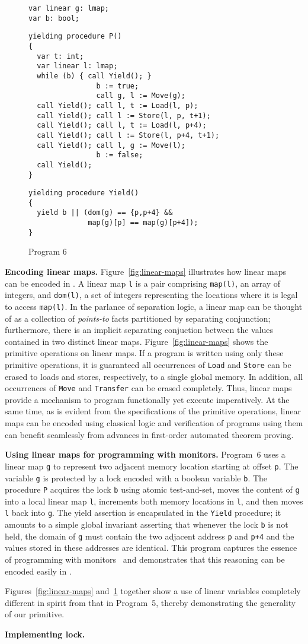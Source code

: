 \begin{figure}
\begin{verbatim}
var linear g: lmap;
var b: bool;
\end{verbatim}
\begin{verbatim}
yielding procedure P()
{
  var t: int;
  var linear l: lmap;
  while (b) { call Yield(); }
                b := true;
                call g, l := Move(g);
  call Yield(); call l, t := Load(l, p);
  call Yield(); call l := Store(l, p, t+1);
  call Yield(); call l, t := Load(l, p+4);
  call Yield(); call l := Store(l, p+4, t+1);
  call Yield(); call l, g := Move(l);
                b := false;
  call Yield();
}
\end{verbatim}
\begin{verbatim}
yielding procedure Yield() 
{
  yield b || (dom(g) == {p,p+4} && 
              map(g)[p] == map(g)[p+4]);
}
\end{verbatim}
\caption{Program 6}
\label{fig:ex6}
\end{figure}

{\bf Encoding linear maps.}
Figure~\ref{fig:linear-maps} illustrates how linear maps~\cite{LahiriQW11} can be encoded in \civl.
A linear map {\tt l} is a pair comprising {\tt map(l)}, an array of integers, 
and {\tt dom(l)}, a set of integers representing the locations where it is legal to access {\tt map(l)}.
In the parlance of separation logic, a linear map can be thought of as a collection of
{\em points-to} facts partitioned by separating conjunction; 
furthermore, there is an implicit separating conjuction between the values contained in two distinct linear maps.
Figure~\ref{fig:linear-maps} shows the primitive operations on linear maps.
If a program is written using only these primitive operations, it is guaranteed all 
occurrences of {\tt Load} and {\tt Store} can be erased to loads and stores, respectively, 
to a single global memory.  
In addition, all occurrences of {\tt Move} and {\tt Transfer} can be erased completely.
Thus, linear maps provide a mechanism to program functionally yet execute imperatively.
At the same time, as is evident from the specifications of the primitive operations,
linear maps can be encoded using classical logic and verification of programs using them can benefit 
seamlessly from advances in first-order automated theorem proving.

{\bf Using linear maps for programming with monitors.}
Program~6 uses a linear map {\tt g} to represent two adjacent memory location starting at offset {\tt p}.
The variable {\tt g} is protected by a lock encoded with a boolean variable {\tt b}.
The procedure {\tt P} acquires the lock {\tt b} using atomic test-and-set, moves the content of {\tt g} into a local 
linear map {\tt l}, increments both memory locations in {\tt l}, and then moves {\tt l} back into {\tt g}.
The yield assertion is encapsulated in the {\tt Yield} procedure; 
it amounts to a simple global invariant asserting that whenever the lock {\tt b} is not held, the domain of {\tt g} must
contain the two adjacent address {\tt p} and {\tt p+4} and the values stored in these addresses are identical.
This program captures the essence of programming with monitors~\cite{Hoare74} and demonstrates that this reasoning 
can be encoded easily in \civl.

Figures~\ref{fig:linear-maps} and~\ref{fig:ex6} together show a use of linear variables completely different in spirit 
from that in Program~5, thereby demonstrating the generality of our primitive.


{\bf Implementing lock.}
